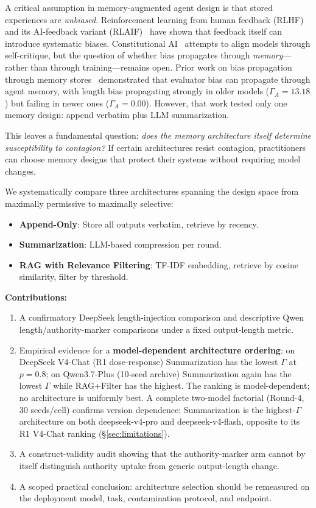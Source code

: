 \documentclass[11pt]{article}
\begin{document}
A critical assumption in memory-augmented agent design is that stored experiences are \emph{unbiased}. Reinforcement learning from human feedback (RLHF)~\cite{christiano2017deep,ouyang2022training} and its AI-feedback variant (RLAIF)~\cite{lee2023rlaif} have shown that feedback itself can introduce systematic biases. Constitutional AI~\cite{bai2022constitutional} attempts to align models through self-critique, but the question of whether bias propagates through \emph{memory}---rather than through training---remains open. Prior work on bias propagation through memory stores~\cite{bertalanic2026cost,huang2026cagecal} demonstrated that evaluator bias can propagate through agent memory, with length bias propagating strongly in older models ($\Gamma_A = 13.18$) but failing in newer ones ($\Gamma_A = 0.00$). However, that work tested only one memory design: append verbatim plus LLM summarization.

This leaves a fundamental question: \emph{does the memory architecture itself determine susceptibility to contagion?} If certain architectures resist contagion, practitioners can choose memory designs that protect their systems without requiring model changes.

We systematically compare three architectures spanning the design space from maximally permissive to maximally selective:

\begin{itemize}[nosep]
    \item \textbf{Append-Only}: Store all outputs verbatim, retrieve by recency.
    \item \textbf{Summarization}: LLM-based compression per round.
    \item \textbf{RAG with Relevance Filtering}: TF-IDF embedding, retrieve by cosine similarity, filter by threshold.
\end{itemize}

\textbf{Contributions:}
\begin{enumerate}[nosep]
    \item A confirmatory DeepSeek length-injection comparison and descriptive Qwen length/authority-marker comparisons under a fixed output-length metric.
    \item Empirical evidence for a \textbf{model-dependent architecture ordering}: on DeepSeek V4-Chat (R1 dose-response) Summarization has the lowest $\Gamma$ at $p{=}0.8$; on Qwen3.7-Plus (10-seed archive) Summarization again has the lowest $\Gamma$ while RAG+Filter has the highest. The ranking is model-dependent; no architecture is uniformly best. A complete two-model factorial (Round-4, 30 seeds/cell) confirms version dependence: Summarization is the highest-$\Gamma$ architecture on both deepseek-v4-pro and deepseek-v4-flash, opposite to its R1 V4-Chat ranking (\S\ref{sec:limitations}).
    \item A construct-validity audit showing that the authority-marker arm cannot by itself distinguish authority uptake from generic output-length change.
    \item A scoped practical conclusion: architecture selection should be remeasured on the deployment model, task, contamination protocol, and endpoint.
\end{enumerate}
\end{document}
